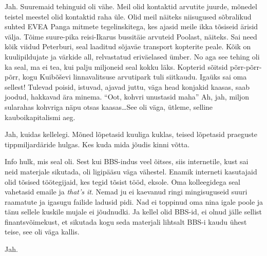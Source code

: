 
Jah. Suuremaid tehinguid oli vähe. Meil olid kontaktid arvutite juurde, mõnedel 
teistel meestel olid kontaktid raha üle. Olid meil näiteks niisugused 
sõbralikud suhted EVEA Panga mitmete tegelinskitega, kes 
ajasid meile ikka tõsiseid ärisid välja. Tõime suure-pika reisi-Ikarus 
bussitäie arvuteid Poolast, näiteks. Sai need kõik viidud Peterburi, seal 
laaditud sõjaväe transport kopterite peale. Kõik on kuulipildujate ja värkide 
all, relvastatud eriväelased ümber. No aga see tehing oli ka seal, ma ei tea, 
kui palju miljoneid seal kokku läks. Kopterid sõitsid põrr-põrr-põrr, kogu 
Kuibõševi linnavalitsuse arvutipark tuli siitkaudu. Igaüks sai oma sellest! 
Tulevad poisid, istuvad, ajavad juttu, väga head konjakid kaasas, saab joodud, 
hakkavad ära minema. \enquote{Oot, kohvri unustasid maha} Ah, jah, miljon 
sularahas kohvriga näpu otsas kaasas\ldots See oli väga, ütleme, selline 
kauboikapitalismi aeg. 


Jah, kuidas kellelegi. Mõned lõpetasid kuuliga kuklas, teised lõpetasid 
praeguste tippmiljardäride hulgas. Kes kuda mida jõudis kinni võtta.


Info hulk, mis seal oli. Sest kui BBS-indus veel õitses, siis internetile, kust 
sai neid materjale sikutada, oli ligipääsu väga vähestel. Enamik interneti 
kasutajaid olid tõsised töötegijaid, kes tegid tõsist tööd, eksole. Oma 
kolleegidega seal vahetasid emaile ja \emph{that's it}. Nemad ju ei kaevanud 
ringi mingisuguseid suuri raamatute ja igasugu failide ladusid pidi. Nad ei 
toppinud oma nina igale poole ja tänu sellele kuskile mujale ei jõudnudki. Ja 
kellel olid BBS-id, ei olnud jälle sellist finantsvõimekust, et sikutada kogu 
seda materjali lihtsalt BBS-i kaudu ühest teise, see oli väga kallis.
                 

Jah.


